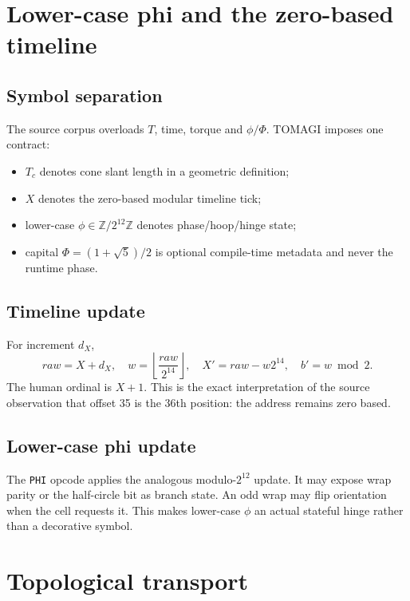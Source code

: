 \documentclass[11pt,a4paper]{article}
\newcommand{\code}[1]{\texttt{#1}}
\begin{document}
\section{Lower-case phi and the zero-based timeline}

\subsection{Symbol separation}
The source corpus overloads $T$, time, torque and $\phi/\Phi$. TOMAGI imposes one contract:
\begin{itemize}
\item $T_c$ denotes cone slant length in a geometric definition;
\item $X$ denotes the zero-based modular timeline tick;
\item lower-case $\phi\in\mathbb{Z}/2^{12}\mathbb{Z}$ denotes phase/hoop/hinge state;
\item capital $\Phi=(1+\sqrt5)/2$ is optional compile-time metadata and never the runtime phase.
\end{itemize}

\subsection{Timeline update}
For increment $d_X$,
\begin{equation}
raw=X+d_X,
\quad
w=\left\lfloor\frac{raw}{2^{14}}\right\rfloor,
\quad
X'=raw-w2^{14},
\quad
b'=w\bmod2.
\end{equation}
The human ordinal is $X+1$. This is the exact interpretation of the source observation that offset 35 is the 36th position: the address remains zero based.

\subsection{Lower-case phi update}
The \code{PHI} opcode applies the analogous modulo-$2^{12}$ update. It may expose wrap parity or the half-circle bit as branch state. An odd wrap may flip orientation when the cell requests it. This makes lower-case $\phi$ an actual stateful hinge rather than a decorative symbol.

\section{Topological transport}
\end{document}

